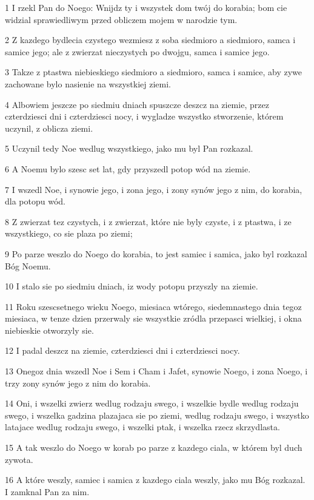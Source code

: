 \par 1 I rzekl Pan do Noego: Wnijdz ty i wszystek dom twój do korabia; bom cie widzial sprawiedliwym przed obliczem mojem w narodzie tym.
\par 2 Z kazdego bydlecia czystego wezmiesz z soba siedmioro a siedmioro, samca i samice jego; ale z zwierzat nieczystych po dwojgu, samca i samice jego.
\par 3 Takze z ptastwa niebieskiego siedmioro a siedmioro, samca i samice, aby zywe zachowane bylo nasienie na wszystkiej ziemi.
\par 4 Albowiem jeszcze po siedmiu dniach spuszcze deszcz na ziemie, przez czterdziesci dni i czterdziesci nocy, i wygladze wszystko stworzenie, którem uczynil, z oblicza ziemi.
\par 5 Uczynil tedy Noe wedlug wszystkiego, jako mu byl Pan rozkazal.
\par 6 A Noemu bylo szesc set lat, gdy przyszedl potop wód na ziemie.
\par 7 I wszedl Noe, i synowie jego, i zona jego, i zony synów jego z nim, do korabia, dla potopu wód.
\par 8 Z zwierzat tez czystych, i z zwierzat, które nie byly czyste, i z ptastwa, i ze wszystkiego, co sie plaza po ziemi;
\par 9 Po parze weszlo do Noego do korabia, to jest samiec i samica, jako byl rozkazal Bóg Noemu.
\par 10 I stalo sie po siedmiu dniach, iz wody potopu przyszly na ziemie.
\par 11 Roku szescsetnego wieku Noego, miesiaca wtórego, siedemnastego dnia tegoz miesiaca, w tenze dzien przerwaly sie wszystkie zródla przepasci wielkiej, i okna niebieskie otworzyly sie.
\par 12 I padal deszcz na ziemie, czterdziesci dni i czterdziesci nocy.
\par 13 Onegoz dnia wszedl Noe i Sem i Cham i Jafet, synowie Noego, i zona Noego, i trzy zony synów jego z nim do korabia.
\par 14 Oni, i wszelki zwierz wedlug rodzaju swego, i wszelkie bydle wedlug rodzaju swego, i wszelka gadzina plazajaca sie po ziemi, wedlug rodzaju swego, i wszystko latajace wedlug rodzaju swego, i wszelki ptak, i wszelka rzecz skrzydlasta.
\par 15 A tak weszlo do Noego w korab po parze z kazdego ciala, w którem byl duch zywota.
\par 16 A które weszly, samiec i samica z kazdego ciala weszly, jako mu Bóg rozkazal. I zamknal Pan za nim.
